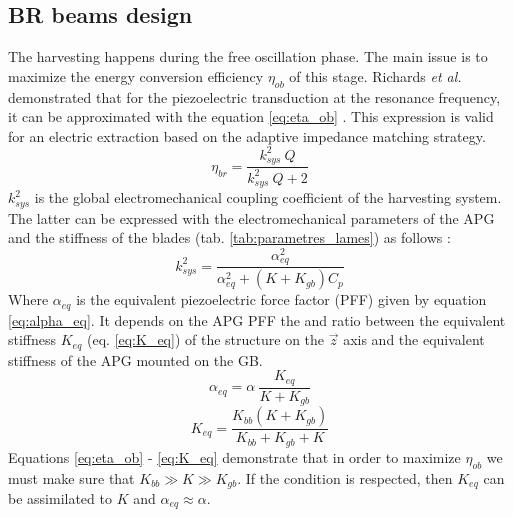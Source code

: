 \documentclass[3p,twocolumn,preprint]{elsarticle}
\begin{document}
	\subsection{BR beams design}	
	\label{subsec:BR blades design}
The harvesting happens during the free oscillation phase. The main issue is to maximize the energy conversion efficiency $\eta_{ob}$ of this stage. Richards \emph{et al.} demonstrated that for the piezoelectric transduction at the resonance frequency, it can be approximated with the equation \ref{eq:eta_ob} \cite{Richards2004}. This expression is valid for an electric extraction based on the adaptive impedance matching strategy.
\begin{equation}
	\eta_{br} = \dfrac{k^2_{sys}\ Q}{k^2_{sys}\ Q + 2}
	\label{eq:eta_ob}
\end{equation}
$k^2_{sys}$ is the global electromechanical coupling coefficient of the harvesting system. The latter can be expressed with the electromechanical parameters of the APG and the stiffness of the blades (tab. \ref{tab:parametres_lames}) as follows :
\begin{equation}
	k^2_{sys} = \dfrac{\alpha^2_{eq}}{\alpha^2_{eq} + (K+K_{gb})C_p}
	\label{eq:k2_sys}
\end{equation}
Where $\alpha_{eq}$ is the equivalent piezoelectric force factor (PFF) given by equation \ref{eq:alpha_eq}. It depends on the APG PFF the and ratio between the equivalent stiffness $K_{eq}$ (eq. \ref{eq:K_eq}) of the structure on the $\vec{z}$ axis and the equivalent stiffness of the APG mounted on the GB.
\begin{equation}
	\alpha_{eq} = \alpha\ \dfrac{K_{eq}}{K + K_{gb}} 
	\label{eq:alpha_eq}
\end{equation}
\begin{equation}
	K_{eq} = \dfrac{K_{bb}(K + K_{gb})}{K_{bb} + K_{gb} + K}
	\label{eq:K_eq}
\end{equation}
Equations \ref{eq:eta_ob} - \ref{eq:K_eq} demonstrate that in order to maximize $\eta_{ob}$ we must make sure that $K_{bb} \gg K \gg K_{gb}$. If the condition is respected, then $K_{eq}$ can be assimilated to $K$ and $\alpha_{eq} \approx \alpha$. 
\end{document}
